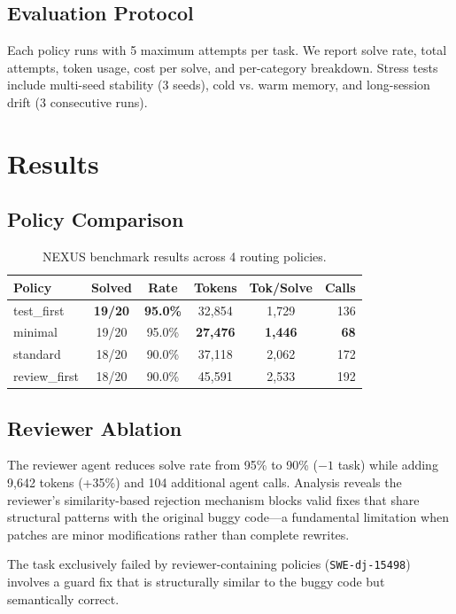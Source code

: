 \documentclass[11pt]{article}
\begin{document}
\subsection{Evaluation Protocol}
Each policy runs with 5 maximum attempts per task. We report solve rate,
total attempts, token usage, cost per solve, and per-category breakdown.
Stress tests include multi-seed stability (3 seeds), cold vs. warm memory,
and long-session drift (3 consecutive runs).

\section{Results}

\subsection{Policy Comparison}

\begin{table}[h]
\centering
\caption{NEXUS benchmark results across 4 routing policies.}
\label{tab:policies}
\begin{tabular}{lccccr}
\toprule
\textbf{Policy} & \textbf{Solved} & \textbf{Rate} & \textbf{Tokens} & \textbf{Tok/Solve} & \textbf{Calls} \\
\midrule
test\_first & \textbf{19/20} & \textbf{95.0\%} & 32,854 & 1,729 & 136 \\
minimal & 19/20 & 95.0\% & \textbf{27,476} & \textbf{1,446} & \textbf{68} \\
standard & 18/20 & 90.0\% & 37,118 & 2,062 & 172 \\
review\_first & 18/20 & 90.0\% & 45,591 & 2,533 & 192 \\
\bottomrule
\end{tabular}
\end{table}

\subsection{Reviewer Ablation}
\label{sec:reviewer}

The reviewer agent reduces solve rate from 95\% to 90\% ($-1$ task)
while adding 9,642 tokens (+35\%) and 104 additional agent calls.
Analysis reveals the reviewer's similarity-based rejection mechanism
blocks valid fixes that share structural patterns with the original
buggy code---a fundamental limitation when patches are minor
modifications rather than complete rewrites.

The task exclusively failed by reviewer-containing policies
(\texttt{SWE-dj-15498}) involves a guard fix that is structurally
similar to the buggy code but semantically correct.
\end{document}
